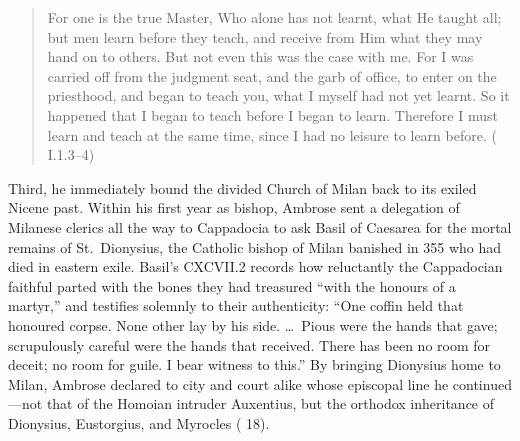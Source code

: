 \begin{quote}
For one is the true Master, Who alone has not learnt, what He taught all; but men learn before they teach, and receive from Him what they may hand on to others. But not even this was the case with me. For I was carried off from the judgment seat, and the garb of office, to enter on the priesthood, and began to teach you, what I myself had not yet learnt. So it happened that I began to teach before I began to learn. Therefore I must learn and teach at the same time, since I had no leisure to learn before. ( I.1.3--4)
\end{quote}

Third, he immediately bound the divided Church of Milan back to its exiled Nicene past. Within his first year as bishop, Ambrose sent a delegation of Milanese clerics all the way to Cappadocia to ask Basil of Caesarea for the mortal remains of St.~Dionysius, the Catholic bishop of Milan banished in 355 who had died in eastern exile. Basil's  CXCVII.2 records how reluctantly the Cappadocian faithful parted with the bones they had treasured ``with the honours of a martyr,'' and testifies solemnly to their authenticity: ``One coffin held that honoured corpse. None other lay by his side. \ldots\ Pious were the hands that gave; scrupulously careful were the hands that received. There has been no room for deceit; no room for guile. I bear witness to this.'' By bringing Dionysius home to Milan, Ambrose declared to city and court alike whose episcopal line he continued---not that of the Homoian intruder Auxentius, but the orthodox inheritance of Dionysius, Eustorgius, and Myrocles ( 18).
